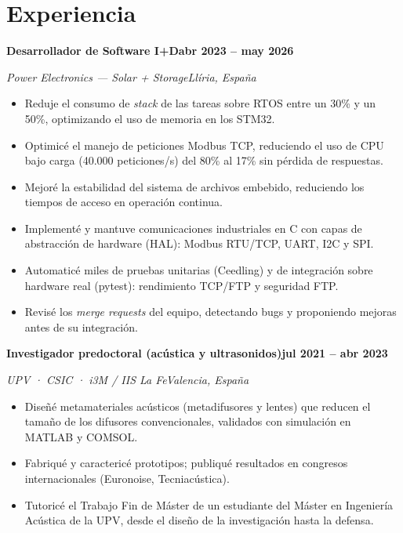 \documentclass[11pt,a4paper]{article}
\let\jmrpsection\section
\renewcommand{\section}[1]{\needspace{4\baselineskip}\jmrpsection{#1}}
\newcommand{\cventry}[4]{%
  \textbf{#1}\hfill\textbf{#4}\par
  {\color{muted}\textit{#2}\hfill\textit{#3}}\par
  \vspace{2pt}
}
\begin{document}
\section{Experiencia}
\cventry{Desarrollador de Software I+D}{Power Electronics — Solar + Storage}{Llíria, España}{abr 2023 – may 2026}
\begin{itemize}
  \item Reduje el consumo de \textit{stack} de las tareas sobre RTOS entre un 30\% y un 50\%, optimizando el uso de memoria en los STM32.
  \item Optimicé el manejo de peticiones Modbus TCP, reduciendo el uso de CPU bajo carga (40.000 peticiones/s) del 80\% al 17\% sin pérdida de respuestas.
  \item Mejoré la estabilidad del sistema de archivos embebido, reduciendo los tiempos de acceso en operación continua.
  \item Implementé y mantuve comunicaciones industriales en C con capas de abstracción de hardware (HAL): Modbus RTU/TCP, UART, I2C y SPI.
  \item Automaticé miles de pruebas unitarias (Ceedling) y de integración sobre hardware real (pytest): rendimiento TCP/FTP y seguridad FTP.
  \item Revisé los \textit{merge requests} del equipo, detectando bugs y proponiendo mejoras antes de su integración.
\end{itemize}\vspace{2pt}

\cventry{Investigador predoctoral (acústica y ultrasonidos)}{UPV · CSIC · i3M / IIS La Fe}{Valencia, España}{jul 2021 – abr 2023}
\begin{itemize}
  \item Diseñé metamateriales acústicos (metadifusores y lentes) que reducen el tamaño de los difusores convencionales, validados con simulación en MATLAB y COMSOL.
  \item Fabriqué y caractericé prototipos; publiqué resultados en congresos internacionales (Euronoise, Tecniacústica).
  \item Tutoricé el Trabajo Fin de Máster de un estudiante del Máster en Ingeniería Acústica de la UPV, desde el diseño de la investigación hasta la defensa.
\end{itemize}\vspace{2pt}
\end{document}
